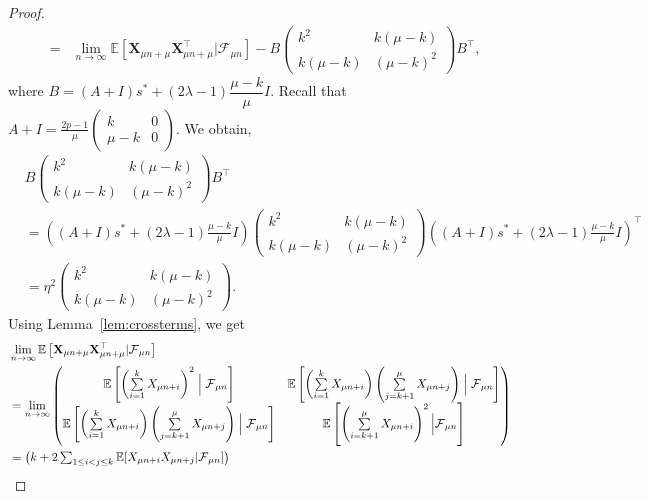 \documentclass{article}
\numberwithin{equation}{section}
\newcommand{\FF}{\mbox{${\mathcal F}$}}
\newcommand{\1}{\mathbf{1}}
\newcommand{\0}{\mathbf{0}}
\newcommand{\E}{\mbox{${\mathbb E}$}}
\begin{document}
\begin{proof}
\begin{eqnarray}
       &=& \lim_{n \to \infty} \E\left[ {\mathbf{X}_{\mu n + \mu}}{\mathbf{X}^\top_{\mu n + \mu}} \vert \FF_{\mu n} \right] - B \begin{pmatrix} k^2 & k(\mu-k)\\ k(\mu-k) & (\mu-k)^2 \end{pmatrix} B^\top,
\end{eqnarray}
where $B=(A+I)s^*+(2\lambda-1)\dfrac{\mu - k}{\mu}I$. Recall that $A+I
= \frac{2p-1}{\mu} \begin{pmatrix}
k & 0\\
\mu-k & 0
\end{pmatrix}$. We obtain,
\begin{align} \label{eq:term2}
& B \begin{pmatrix} k^2 & k(\mu-k)\\ k(\mu-k) & (\mu-k)^2 \end{pmatrix} B^\top \nonumber \\
&= \left((A+I)s^*+(2\lambda-1)\frac{\mu-k}{\mu}I\right)
\begin{pmatrix}
k^2 & k(\mu-k) \nonumber\\
k(\mu-k) & (\mu-k)^2
\end{pmatrix}
\left((A+I)s^*+(2\lambda-1)\frac{\mu-k}{\mu}I\right)^\top \nonumber \\
&=
\eta^2
\begin{pmatrix}
k^2 & k(\mu-k)\\
k(\mu-k) & (\mu-k)^2
\end{pmatrix}.
\end{align}
Using Lemma~\ref{lem:crossterms}, we get
\begin{align} \label{eq:crossterms}
& \lim_{n \to \infty} \E\left[ {\mathbf{X}_{\mu n + \mu}}{\mathbf{X}^\top_{\mu n + \mu}} \vert \FF_{\mu n} \right] \nonumber \\
&=   \lim_{n \to \infty} \begin{pmatrix}
\E\left[\left(\sum\limits_{i=1}^{k}X_{\mu n+i}\right)^2\Bigm|\FF_{\mu n}\right]
&
\E\left[\left(\sum\limits_{i=1}^{k}X_{\mu n+i}\right)
\left(\sum\limits_{j=k+1}^{\mu}X_{\mu n+j}\right)
\Bigm|\FF_{\mu n}\right]
\\
\E\left[\left(\sum\limits_{i=1}^{k}X_{\mu n+i}\right)
\left(\sum\limits_{j=k+1}^{\mu}X_{\mu n+j}\right)
\Bigm|\FF_{\mu n}\right]
&
\E\left[\left(\sum\limits_{i=k+1}^{\mu}X_{\mu n+i}\right)^2
\Big|\FF_{\mu n}\right]
\end{pmatrix}  \nonumber \\
&=
\begin{pmatrix}
k + 2\sum_{1\le i<j\le k} \E[X_{\mu n+i}X_{\mu n+j}|\FF_{\mu n}]

\end{pmatrix}
\end{align}
\end{proof}
\end{document}
